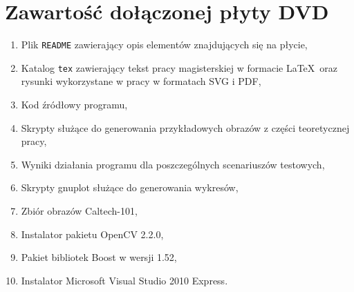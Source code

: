 \chapter{Zawartość dołączonej płyty DVD}

\begin{enumerate}
  \item Plik \texttt{README} zawierający opis elementów znajdujących się na płycie,
  \item Katalog \texttt{tex} zawierający tekst pracy magisterskiej w formacie \LaTeX~oraz rysunki wykorzystane w pracy w formatach SVG i PDF,
  \item Kod źródłowy programu,
  \item Skrypty służące do generowania przykładowych obrazów z części teoretycznej pracy,
  \item Wyniki działania programu dla poszczególnych scenariuszów testowych,
  \item Skrypty gnuplot służące do generowania wykresów,
  \item Zbiór obrazów Caltech-101,
  \item Instalator pakietu OpenCV 2.2.0,
  \item Pakiet bibliotek Boost w wersji 1.52,
  \item Instalator Microsoft Visual Studio 2010 Express.
\end{enumerate}